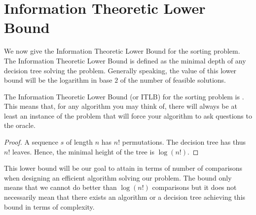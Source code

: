 \section{Information Theoretic Lower Bound}
\label{tree:sorting:ITLB}

We now give the Information Theoretic Lower Bound for the sorting problem. The
Information Theoretic Lower Bound is defined as the minimal depth of any
decision tree solving the problem. Generally speaking, the value of this lower
bound will be the logarithm in base \(2\) of the number of feasible solutions.


\begin{theorem}
The Information Theoretic Lower Bound (or ITLB) for the sorting problem is
. This means that, for any algorithm you may think of,
there will always be at least an instance of the problem that will force your
algorithm to ask  questions to the oracle.
\end{theorem}

\begin{proof}
A sequence \(s\) of length \(n\) has \(n!\) permutations. The decision tree has thus
\(n!\) leaves. Hence, the minimal height of the tree is \(\log(n!)\).
\end{proof}

This lower bound will be our goal to attain in terms of number of comparisons
when designing an efficient algorithm solving our problem. The bound only means
that we cannot do better than \(\log(n!)\) comparisons but it does not
necessarily mean that there exists an algorithm or a decision tree achieving
this bound in terms of complexity.
